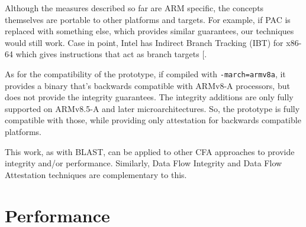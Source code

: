 \documentclass[a4paper, nobind]{templates/ociamthesis}
\begin{document}
Although the measures described so far are ARM specific, the concepts themselves
are portable to other platforms and targets.
For example, if PAC is replaced with something else, which provides similar
guarantees, our techniques would still work. Case in point, Intel has Indirect
Branch Tracking (IBT) for x86-64 which gives instructions that act as branch targets {[}\citeproc{ref-intel-ibt}{32}{]}.

As for the compatibility of the prototype, if compiled with \texttt{-march=armv8a}, it
provides a binary that's backwards compatible with ARMv8-A processors,
but does not provide the integrity guarantees.
The integrity additions are only fully supported on ARMv8.5-A and later microarchitectures.
So, the prototype is fully compatible with those, while providing only attestation for
backwards compatible platforms.

This work, as with BLAST, can be applied to other CFA approaches to provide
integrity and/or performance. Similarly, Data Flow Integrity and Data Flow Attestation
techniques are complementary to this.

\section{Performance}\label{performance}
\end{document}
